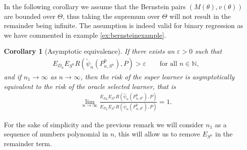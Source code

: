 \documentclass[11pt, a4paper]{article}
\newtheorem{corollary}[theorem]{Corollary}
\theoremstyle{definition}
\theoremstyle{remark}
\newcommand{\btheta}{\theta}
\newcommand{\la}{\psi}
\newcommand{\Sn}{S^n}
\begin{document}
In the following corollary we assume that the Bernstein pairs $ (M(\btheta), v(\btheta)) $ are bounded over $ \Theta $, thus taking the supremum over $ \Theta $ will not result in the remainder being infinite. The assumption is indeed valid for binary regression as we have commented in example \ref{ex:bernsteinexample}. 
\begin{corollary}[Asymptotic equivalence] \label{cor:dslasymptoticequivalence}
    If there exists an $ \varepsilon > 0 $ such that 
   \begin{align*}
       E_{D_n} E_{\Sn} R(\tilde{\la}_n(P_{n, \Sn}^{0}), P) > \varepsilon \qquad \text{for all } n \in \mathbb{N},
   \end{align*}
   and if $ n_1 \to \infty $ as $ n \to \infty $, then the risk of the super learner is asymptotically equivalent to the risk of the oracle selected learner, that is
   \begin{align*}
       \lim_{n \to \infty} \frac{E_{D_n} E_{\Sn} R(\hat{\la}_n(P_{n, \Sn}^{0}), P)}{E_{D_n} E_{\Sn} R(\tilde{\la}_n(P_{n, \Sn}^{0}), P)} = 1.
   \end{align*}
\end{corollary}
For the sake of simplicity and the previous remark we will consider $ n_1 $ as a sequence of numbers polynomial in $ n $, this will allow us to remove $ E_{\Sn} $ in the remainder term. 
\end{document}
